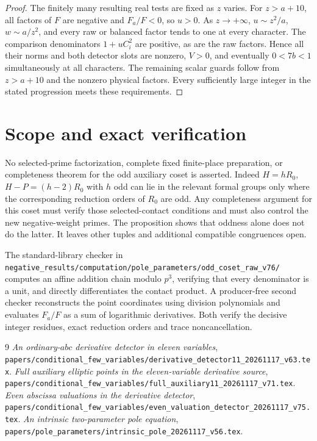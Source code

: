 \documentclass[11pt,a4paper]{article}
\begin{document}
\begin{proof}
The finitely many resulting real tests are fixed as $z$ varies.
For $z>a+10$, all factors of $F$ are negative and $F_a/F<0$,
so $u>0$. As $z\longrightarrow+\infty$, $u\sim z^2/a$,
$w\sim a/z^2$, and every raw or balanced factor tends to one
at every character. The comparison denominators
$1+uC_i^2$ are positive, as are the raw factors. Hence all their
norms and both detector slots are nonzero, $V>0$, and eventually
$0<7b<1$ simultaneously at all characters. The remaining scalar
guards follow from $z>a+10$ and the nonzero physical factors.
Every sufficiently large integer in the stated progression meets
these requirements.
\end{proof}

\section{Scope and exact verification}

No selected-prime factorization, complete fixed finite-place
preparation, or completeness theorem for the odd auxiliary coset
is asserted. Indeed $H=hR_0$, $H-P=(h-2)R_0$ with $h$ odd
can lie in the relevant formal groups only where the corresponding
reduction orders of $R_0$ are odd. Any completeness argument for
this coset must verify those selected-contact conditions and must
also control the new negative-weight primes. The proposition shows
that oddness alone does not do the latter. It leaves other tuples
and additional compatible congruences open.

The standard-library checker in
\nolinkurl{negative_results/computation/pole_parameters/odd_coset_raw_v76/}
computes an affine addition chain modulo $p^3$, verifying that
every denominator is a unit, and directly differentiates the contact
product. A producer-free second checker reconstructs the point
coordinates using division polynomials and evaluates $F_a/F$
as a sum of logarithmic derivatives. Both verify the decisive
integer residues, exact reduction orders and trace noncancellation.

\begin{thebibliography}{9}
\emph{An ordinary-$abc$ derivative detector in
eleven variables},
\nolinkurl{papers/conditional_few_variables/derivative_detector11_20261117_v63.tex}.
\emph{Full auxiliary elliptic points in the eleven-variable
derivative source},
\nolinkurl{papers/conditional_few_variables/full_auxiliary11_20261117_v71.tex}.
\emph{Even abscissa valuations in the derivative detector},
\nolinkurl{papers/conditional_few_variables/even_valuation_detector_20261117_v75.tex}.
\emph{An intrinsic two-parameter pole equation},
\nolinkurl{papers/pole_parameters/intrinsic_pole_20261117_v56.tex}.
\end{thebibliography}
\end{document}
